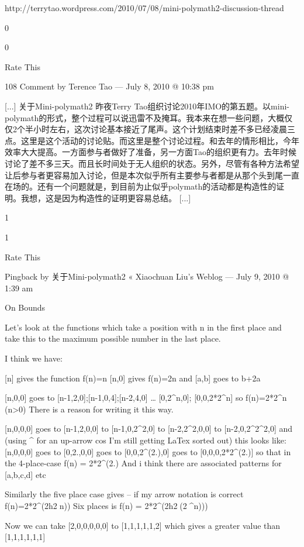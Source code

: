 {    http://terrytao.wordpress.com/2010/07/08/mini-polymath2-discussion-thread
     
    0
     
    0
     
    Rate This

    108 Comment by Terence Tao — July 8, 2010 @ 10:38 pm

    [...] 关于Mini-polymath2 昨夜Terry Tao组织讨论2010年IMO的第五题。以mini-polymath的形式，整个过程可以说迅雷不及掩耳。我本来在想一些问题，大概仅仅2个半小时左右，这次讨论基本接近了尾声。这个计划结束时差不多已经凌晨三点。这里是这个活动的讨论贴。而这里是整个讨论过程。和去年的情形相比，今年效率大大提高。一方面参与者做好了准备，另一方面Tao的组织更有力。去年时候讨论了差不多三天。而且长时间处于无人组织的状态。另外，尽管有各种方法希望让后参与者更容易加入讨论，但是本次似乎所有主要参与者都是从那个头到尾一直在场的。还有一个问题就是，到目前为止似乎polymath的活动都是构造性的证明。我想，这是因为构造性的证明更容易总结。 [...]
     
    1
     
    1
     
    Rate This

    Pingback by 关于Mini-polymath2 « Xiaochuan Liu's Weblog — July 9, 2010 @ 1:39 am

    On Bounds

    Let’s look at the functions which take a position with n in the first place and take this to the maximum possible number in the last place.

    I think we have:

    [n] gives the function f(n)=n
    [n,0] gives f(n)=2n and [a,b] goes to b+2a

    [n,0,0] goes to [n-1,2,0];[n-1,0,4];[n-2,4,0] … [0,2^n,0]; [0,0,2*2^n] so f(n)=2*2^n (n>0)
    There is a reason for writing it this way.

    [n,0,0,0] goes to [n-1,2,0,0] to [n-1,0,2^2,0] to [n-2,2^2,0,0] to [n-2,0,2^2^2,0] and (using ^ for an up-arrow cos I’m still getting LaTex sorted out) this looks like:
    [n,0,0,0] goes to [0,2^^n,0,0] goes to [0,0,2^(2^^n),0] goes to [0,0,0,2*2^(2^^n)]
    so that in the 4-place-case f(n) = 2*2^(2^^n)
    And i think there are associated patterns for [a,b,c,d] etc

    Similarly the five place case gives – if my arrow notation is correct f(n)=2*2^(2^^(2^^^n))
    Six places is f(n) = 2*2^(2^^(2^^^(2^^^^n)))

    Now we can take [2,0,0,0,0,0] to [1,1,1,1,1,2] which gives a greater value than [1,1,1,1,1,1]

}
